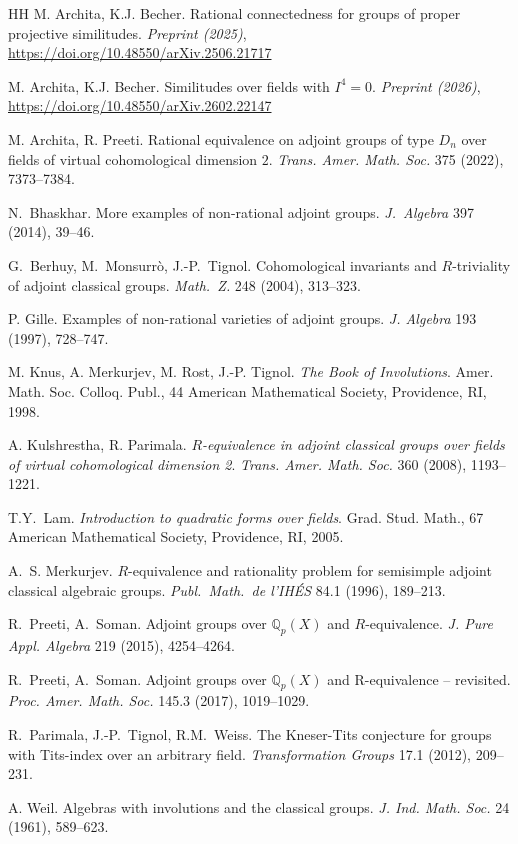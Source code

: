 \documentclass[twoside,11pt]{amsart}
\numberwithin{equation}{section}
\theoremstyle{definition}
\begin{document}
\begin{thebibliography}{HH}
M. Archita, K.J. Becher. 
{Rational connectedness for groups of proper projective similitudes}. 
\emph{Preprint (2025)},
\url{https://doi.org/10.48550/arXiv.2506.21717}


M. Archita, K.J. Becher. 
{Similitudes over fields with $I^4=0$}. 
\emph{Preprint (2026)},\\
\url{https://doi.org/10.48550/arXiv.2602.22147}

 M. Archita, R. Preeti.
Rational equivalence on adjoint groups of type $D_{n}$ over fields of virtual cohomological dimension $2$.
\emph{Trans. Amer. Math. Soc.} 375 (2022), 7373--7384.



 N.~Bhaskhar. 
More examples of non-rational adjoint groups. 
\emph{J.~Algebra} 397 (2014), 39--46. 

 

 G.~Berhuy, M.~Monsurrò, J.-P.~Tignol. 
Cohomological invariants and $R$-triviality of adjoint classical groups. \emph{Math.~Z.} 248 (2004), 313--323.

P. Gille. 
Examples of non-rational varieties of adjoint groups. \emph{J. Algebra} 193 (1997), 728--747.

 M. Knus, A. Merkurjev, M. Rost, J.-P. Tignol. \emph{The Book of Involutions}.
Amer. Math. Soc. Colloq. Publ., 44
American Mathematical Society, Providence, RI, 1998.

  A. Kulshrestha, R. Parimala. \emph{$R$-equivalence in adjoint classical groups over fields of virtual cohomological dimension 2}. \emph{Trans. Amer. Math. Soc.} 360 (2008), 1193--1221.  
 
 T.Y.~Lam. \newblock \emph{Introduction to quadratic forms over fields}.
Grad. Stud. Math., 67
American Mathematical Society, Providence, RI, 2005.
	

 
 A.~S. Merkurjev.
$R$-equivalence and rationality problem for semisimple adjoint classical algebraic groups. \emph{Publ.~Math.~de l'IH\'ES} 84.1 (1996), 189--213. 

 

  R.~Preeti, A.~Soman.
Adjoint groups over $\mathbb{Q}_p(X)$ and $R$-equivalence.
\emph{J. Pure Appl. Algebra} 219 (2015), 4254--4264.

  R.~Preeti, A.~Soman. 
Adjoint groups over $\mathbb{Q}_p(X)$ and R-equivalence -- revisited. \emph{Proc. Amer. Math. Soc.} 145.3 (2017), 1019--1029.

 R.~Parimala, J.-P.~Tignol, R.M.~Weiss. The Kneser-Tits conjecture for groups with Tits-index over an arbitrary field. \emph{Transformation Groups} 17.1 (2012), 209--231.

       
		
 A. Weil. 
Algebras with involutions and the classical groups. \emph{J. Ind. Math. Soc.} 24 (1961), 589--623.

\end{thebibliography}
\end{document}

